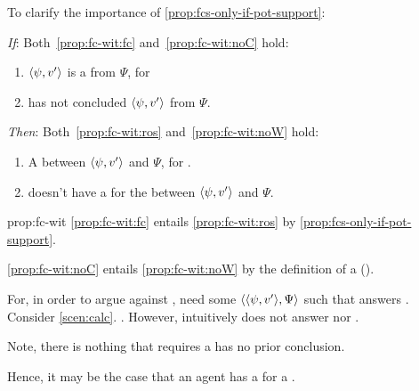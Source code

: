 \begin{note}
  To clarify the importance of \autoref{prop:fcs-only-if-pot-support}:

  \begin{proposition}%
    \label{prop:fc-wit}%
    \vspace{-\baselineskip}
    \begin{itenum}
    \item[\emph{If}:]
      Both~\ref{prop:fc-wit:fc} and~\ref{prop:fc-wit:noC} hold:
      \begin{enumerate}[label=\alph*., ref=(\alph*)]
      \item
        \label{prop:fc-wit:fc}
        \(\langle \psi, v' \rangle\) is a  from \(\Psi\), for \vAgent{}
      \item
        \label{prop:fc-wit:noC}
        \vAgent{} has not concluded \(\langle \psi, v' \rangle\) from \(\Psi\).
      \end{enumerate}
    \item[\emph{Then}:]
      Both~\ref{prop:fc-wit:ros} and~\ref{prop:fc-wit:noW} hold:
      \begin{enumerate}[label=\alph*\('\)., ref=(\alph*\('\))]
      \item
        \label{prop:fc-wit:ros}
        A \ros{} between \(\langle \psi, v' \rangle\) and \(\Psi\), for \vAgent{}.
      \item
        \label{prop:fc-wit:noW}
        \vAgent{} doesn't have a \wit{} for the \ros{} between \(\langle \psi, v' \rangle\) and \(\Psi\).
      \end{enumerate}
    \end{itenum}
    \vspace{-\baselineskip}
  \end{proposition}

  \begin{argument}{prop:fc-wit}
    \ref{prop:fc-wit:fc} entails \ref{prop:fc-wit:ros} by \autoref{prop:fcs-only-if-pot-support}.

    \noindent \ref{prop:fc-wit:noC} entails \ref{prop:fc-wit:noW} by the definition of a \wit{} (\witpage{}).
  \end{argument}

  For, in order to argue against \issueConstraint{}, need some \(\langle \langle \psi, v' \rangle, \Psi \rangle\) such that answers \qWhyV{}.
  Consider \autoref{scen:calc}.
  \fc{}.
  However, intuitively does not answer \qWhy{} nor \qWhyV{}.
\end{note}

\begin{note}
  Note, there is nothing that requires a \fc{} has no prior conclusion.

  Hence, it may be the case that an agent has a \wit{} for a \fc{}.
\end{note}


